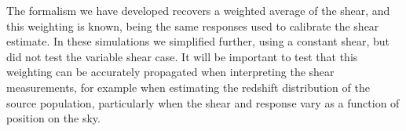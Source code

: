 \documentclass[iop]{emulateapj}
\newcommand{\mcal}{\textsc{metacalibration}}
\begin{document}
The formalism we have developed recovers a weighted average of the shear, and
this weighting is known, being the same responses used to calibrate the shear
estimate.  In these simulations we simplified further, using a constant shear,
but did not test the variable shear case.  It will be important to test that
this weighting can be accurately propagated when interpreting the shear
measurements, for example when estimating the redshift distribution of the
source population, particularly when the shear and response vary as a function
of position on the sky.

\end{document}
